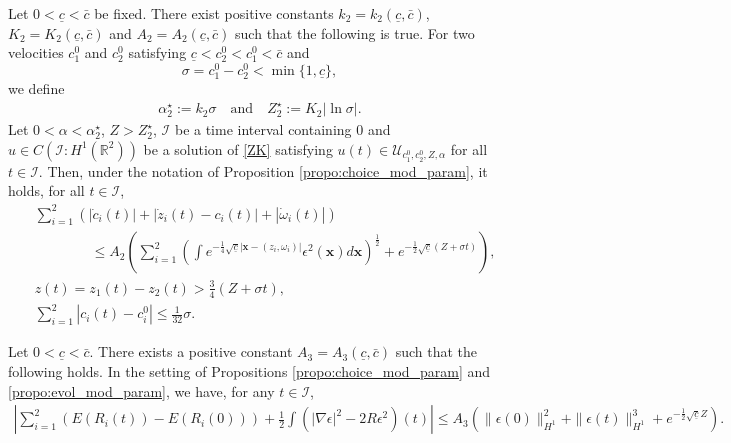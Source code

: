 \documentclass[10pt,a4paper]{amsart}
\newcommand{\bx}{\mathbf{x}}
\begin{document}
	\begin{propo}\label{propo:evol_mod_param}
		Let $0<\underline{c}<\bar{c}$ be fixed. There exist positive constants $k_2=k_2(\underline{c},\bar{c})$, $K_2=K_2(\underline{c},\bar{c})$ and $A_2=A_2(\underline{c},\bar{c})$  such that the following is true.   For two velocities $c_1^0$ and $c_2^0$ satisfying $\underline{c}<c_2^0<c_1^0<\bar{c}$ and 
        \begin{equation} \label{def:sigma}
        \sigma=c_1^0-c_2^0<\min\{1, \underline{c}\},
        \end{equation}
        we define
		\begin{align} \label{def:k2K2}
			\alpha^\star_2:= k_2\sigma \quad \text{and} \quad Z^\star_2 := K_2 | \ln \sigma| .
		\end{align}
		Let $0<\alpha<\alpha_2^{\star}$, $Z>Z_2^{\star}$, $\mathcal{I}$ be a time interval containing $0$ and $u \in C(\mathcal{I} : H^1(\mathbb R^2))$ be a solution of \eqref{ZK} satisfying $u(t) \in \mathcal{U}_{c_1^0, c_2^0, Z, \alpha}$ for all $t \in \mathcal{I}$. Then, under the notation of Proposition \ref{propo:choice_mod_param}, it holds, for all $t \in \mathcal{I}$, 
		\begin{align}
			&\sum_{i=1}^2 \left( \left\vert \dot{c}_i(t) \right\vert  + \left\vert \dot{z}_i(t) -c_i(t) \right\vert + \left\vert \dot{\omega}_i(t) \right\vert \right) \nonumber\\ & \quad \quad \quad \quad \leq A_2 \left( \sum_{i=1}^2\left( \int e^{- \frac{1}{4}\sqrt{\underline{c}} \left\vert \bx - \left( z_i,\omega_i \right) \right\vert } \epsilon^2(\bx) d\bx \right)^\frac12 + e^{-\frac12\sqrt{\underline{c}}\left( Z +  \sigma t \right) } \right), \label{eq:ODE} \\
			& z(t)=z_1(t)-z_2(t)  > \frac34\left(Z +\sigma t\right), \label{eq:boundz} \\
			&\sum_{i=1}^2\left\vert c_i(t) - c_i^0 \right\vert \leq \frac1{32} \sigma. \label{eq:c_n}
		\end{align}
	\end{propo}

	\begin{lemm}\label{lemm:energy}
		Let $0<\underline{c}<\bar{c}$. There exists a positive constant $A_3=A_3(\underline{c},\bar{c})$ such that the following holds. In the setting of Propositions \ref{propo:choice_mod_param} and \ref{propo:evol_mod_param}, we have, for any $t \in \mathcal{I}$,
		\begin{align*}
			\left\vert \sum_{i=1}^2 \left( E(R_i(t))- E(R_i(0))\right) + \frac12 \int \left( \vert \nabla \epsilon \vert^2 - 2 R \epsilon^2 \right)(t) \right\vert \leq A_3 \left( \| \epsilon (0) \|_{H^1}^2 + \| \epsilon(t) \|_{H^1}^3 + e^{-\frac12 \sqrt{\underline{c}}Z} \right).
		\end{align*}
	\end{lemm}
\end{document}
